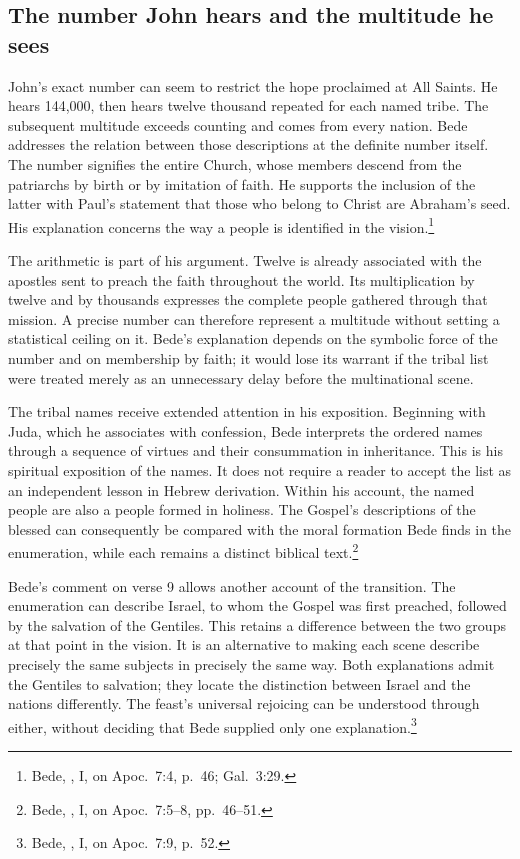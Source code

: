 
\subsection{The number John hears and the multitude he sees}
John's exact number can seem to restrict the hope proclaimed at All Saints.
He hears 144,000, then hears twelve thousand repeated for each named tribe.
The subsequent multitude exceeds counting and comes from every nation.
Bede addresses the relation between those descriptions at the definite
number itself. The number signifies the entire Church, whose members
descend from the patriarchs by birth or by imitation of faith. He supports
the inclusion of the latter with Paul's statement that those who belong to
Christ are Abraham's seed. His explanation concerns the way a people is
identified in the vision.\footnote{Bede, , I, on
Apoc.~7:4, p.~46; Gal.~3:29.}

The arithmetic is part of his argument. Twelve is already associated with
the apostles sent to preach the faith throughout the world. Its multiplication
by twelve and by thousands expresses the complete people gathered through
that mission. A precise number can therefore represent a multitude without
setting a statistical ceiling on it. Bede's explanation depends on the
symbolic force of the number and on membership by faith; it would lose its
warrant if the tribal list were treated merely as an unnecessary delay
before the multinational scene.

The tribal names receive extended attention in his exposition. Beginning
with Juda, which he associates with confession, Bede interprets the ordered
names through a sequence of virtues and their consummation in inheritance.
This is his spiritual exposition of the names. It does not require a reader
to accept the list as an independent lesson in Hebrew derivation.
Within his account, the named people are also a people formed in holiness.
The Gospel's descriptions of the blessed can consequently be compared with
the moral formation Bede finds in the enumeration, while each remains a
distinct biblical text.\footnote{Bede, , I, on
Apoc.~7:5--8, pp.~46--51.}

Bede's comment on verse 9 allows another account of the transition.
The enumeration can describe Israel, to whom the Gospel was first preached,
followed by the salvation of the Gentiles. This retains a difference between
the two groups at that point in the vision. It is an alternative to making
each scene describe precisely the same subjects in precisely the same way.
Both explanations admit the Gentiles to salvation; they locate the
distinction between Israel and the nations differently. The feast's
universal rejoicing can be understood through either, without deciding
that Bede supplied only one explanation.\footnote{Bede,
, I, on Apoc.~7:9, p.~52.}

